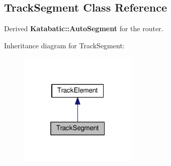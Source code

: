 \hypertarget{classKite_1_1TrackSegment}{\subsection{Track\-Segment Class Reference}
\label{classKite_1_1TrackSegment}
}


Derived {\bf Katabatic\-::\-Auto\-Segment} for the router.  




Inheritance diagram for Track\-Segment\-:\nopagebreak
\begin{figure}[H]
\begin{center}
\leavevmode
\includegraphics[width=160pt]{classKite_1_1TrackSegment__inherit__graph}
\end{center}
\end{figure}
